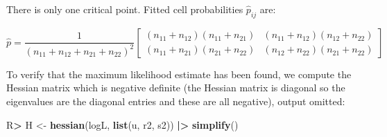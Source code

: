 \documentclass[10pt,]{article}
\newenvironment{Shaded}{\begin{snugshade}}{\end{snugshade}}
\newcommand{\DataTypeTok}[1]{\textcolor[rgb]{0.13,0.29,0.53}{#1}}
\newcommand{\DecValTok}[1]{\textcolor[rgb]{0.00,0.00,0.81}{#1}}
\newcommand{\ErrorTok}[1]{\textcolor[rgb]{0.64,0.00,0.00}{\textbf{#1}}}
\newcommand{\KeywordTok}[1]{\textcolor[rgb]{0.13,0.29,0.53}{\textbf{#1}}}
\newcommand{\NormalTok}[1]{#1}
\newcommand{\OperatorTok}[1]{\textcolor[rgb]{0.81,0.36,0.00}{\textbf{#1}}}
\newcommand{\StringTok}[1]{\textcolor[rgb]{0.31,0.60,0.02}{#1}}
\begin{document}
There is only one critical point. Fitted cell probabilities
\(\hat p_{ij}\) are:

\begin{Shaded}
\end{Shaded}

\[
\hat p = \frac{1}{\left(n_{11} + n_{12} + n_{21} + n_{22}\right)^{2}}  \left[\begin{matrix}\left(n_{11} + n_{12}\right) \left(n_{11} + n_{21}\right) & \left(n_{11} + n_{12}\right) \left(n_{12} + n_{22}\right)\\\left(n_{11} + n_{21}\right) \left(n_{21} + n_{22}\right) & \left(n_{12} + n_{22}\right) \left(n_{21} + n_{22}\right)\end{matrix}\right]
\]

To verify that the maximum likelihood estimate has been found, we
compute the Hessian matrix which is negative definite (the Hessian
matrix is diagonal so the eigenvalues are the diagonal entries and these
are all negative), output omitted:

\begin{Shaded}
\begin{Highlighting}[]
\NormalTok{R}\OperatorTok{>}\StringTok{ }\NormalTok{H <-}\StringTok{ }\KeywordTok{hessian}\NormalTok{(logL, }\KeywordTok{list}\NormalTok{(u, r2, s2)) }\OperatorTok{|}\ErrorTok{>}\StringTok{ }\KeywordTok{simplify}\NormalTok{()}
\end{Highlighting}
\end{Shaded}
\end{document}
